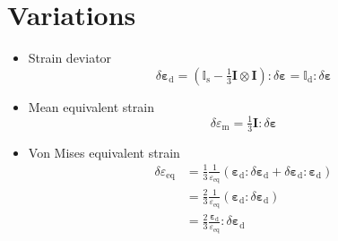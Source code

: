 \documentclass[times,namecite]{goose-article}
\begin{document}
\section{Variations}
\label{sec:ap:variations}

\begin{itemize}
%
\item Strain deviator
\begin{equation}
  \delta \bm{\varepsilon}_\mathrm{d}
  = \left( \mathbb{I}_\mathrm{s} - \tfrac{1}{3} \bm{I} \otimes \bm{I} \right) :
    \delta \bm{\varepsilon}
  = \mathbb{I}_\mathrm{d} : \delta \bm{\varepsilon}
\end{equation}
%
\item Mean equivalent strain
\begin{equation}
  \delta \varepsilon_\mathrm{m}
  = \tfrac{1}{3} \bm{I} : \delta \bm{\varepsilon}
\end{equation}
%
\item Von Mises equivalent strain
\begin{align}
  \delta \varepsilon_\mathrm{eq}
  &= \frac{1}{3} \frac{1}{\varepsilon_\mathrm{eq}}
     \left( \bm{\varepsilon}_\mathrm{d} : \delta \bm{\varepsilon}_\mathrm{d} +
     \delta \bm{\varepsilon}_\mathrm{d} : \bm{\varepsilon}_\mathrm{d} \right) \\
  &= \frac{2}{3} \frac{1}{\varepsilon_\mathrm{eq}}
     \left( \bm{\varepsilon}_\mathrm{d} : \delta \bm{\varepsilon}_\mathrm{d} \right) \\
  &= \frac{2}{3} \frac{\bm{\varepsilon}_\mathrm{d}}{\varepsilon_\mathrm{eq}} :
     \delta \bm{\varepsilon}_\mathrm{d}
\end{align}
%
\end{itemize}


% 
\end{document}
